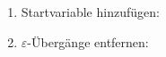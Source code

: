 \begin{enumerate}
    \item Startvariable hinzufügen:
        \begin{comment}
  \begin{align*}
            S_0&\rightarrow S \\
            S &\rightarrow ASA \mid aB \\
            A &\rightarrow B \mid S \\
            B &\rightarrow b \mid \varepsilon
        \end{align*}
\end{comment}

    \item \(\varepsilon\)-Übergänge entfernen:
   \begin{comment}
   \begin{enumerate}
        \item \begin{align*}
            S_0 &\rightarrow S \\
            S &\rightarrow ASA \mid aB \mid a \\
            A &\rightarrow B \mid \varepsilon \mid S \\
            B &\rightarrow b
        \end{align*}
        \item \begin{align*}
            S_0 &\rightarrow S \\
            S &\rightarrow AS \mid SA \mid ASA \mid aB \mid a \\
            A &\rightarrow B \mid S \\
            B &\rightarrow b
        \end{align*}
    \end{enumerate}
\end{comment}


\end{enumerate}
